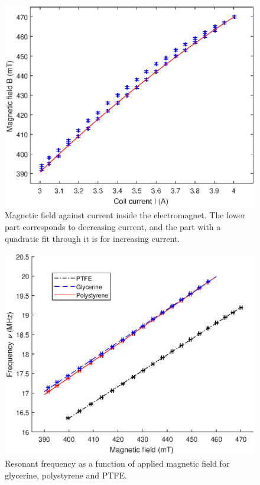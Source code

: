 \documentclass[a4paper]{jpconf}
\numberwithin{equation}{section}
\begin{document}
\begin{figure}[h!]
	\includegraphics[scale=0.67]{NMR_calibration_nocaption_nolegend_red.eps}
	\hspace{2pc}
	\begin{minipage}[b]{3in}
		\caption{Magnetic field against current inside the electromagnet. The lower part corresponds to decreasing current, and the part with a quadratic fit through it is for increasing current.}
		\label{fig: hysteresis curve}
	\end{minipage}
\end{figure}
\begin{figure}[h!]
	\includegraphics[scale=0.67]{NMR_resonances.eps}
	\hspace{2pc}
	\begin{minipage}[b]{3in}
		\caption{Resonant frequency as a function of applied magnetic field for glycerine, polystyrene and PTFE.}
		\label{fig: NMR resonances}
	\end{minipage}
\end{figure}
\end{document}
